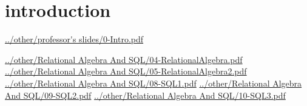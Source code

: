 \section{introduction}
\url{../other/professor's slides/0-Intro.pdf}\newline
\newline


\url{../other/Relational Algebra And SQL/04-RelationalAlgebra.pdf}\newline
\newline
\url{../other/Relational Algebra And SQL/05-RelationalAlgebra2.pdf}\newline
\newline
\url{../other/Relational Algebra And SQL/08-SQL1.pdf}\newline
\newline
\url{../other/Relational Algebra And SQL/09-SQL2.pdf}\newline
\newline
\url{../other/Relational Algebra And SQL/10-SQL3.pdf}